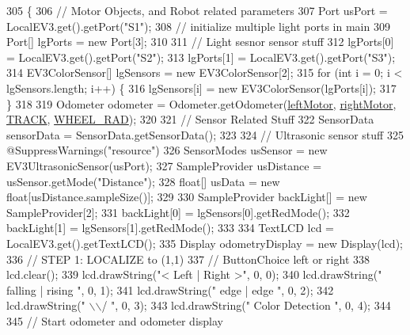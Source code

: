 \begin{DoxyCode}
305                                                       \{
306     \textcolor{comment}{// Motor Objects, and Robot related parameters}
307     Port usPort = LocalEV3.get().getPort(\textcolor{stringliteral}{"S1"});
308     \textcolor{comment}{// initialize multiple light ports in main}
309     Port[] lgPorts = \textcolor{keyword}{new} Port[3];
310 
311     \textcolor{comment}{// Light sesnor sensor stuff}
312     lgPorts[0] = LocalEV3.get().getPort(\textcolor{stringliteral}{"S2"});
313     lgPorts[1] = LocalEV3.get().getPort(\textcolor{stringliteral}{"S3"});
314     EV3ColorSensor[] lgSensors = \textcolor{keyword}{new} EV3ColorSensor[2];
315     \textcolor{keywordflow}{for} (\textcolor{keywordtype}{int} i = 0; i < lgSensors.length; i++) \{
316       lgSensors[i] = \textcolor{keyword}{new} EV3ColorSensor(lgPorts[i]);
317     \}
318 
319     Odometer odometer = Odometer.getOdometer(\hyperlink{enumca_1_1mcgill_1_1ecse211_1_1project_1_1_game_a7c673571bf50fdb6917a9d7bb671e003}{leftMotor}, \hyperlink{enumca_1_1mcgill_1_1ecse211_1_1project_1_1_game_a7a05fcf37c4435c32270776a427ba0d2}{rightMotor}, 
      \hyperlink{enumca_1_1mcgill_1_1ecse211_1_1project_1_1_game_a64cf12cdd6772ac1ce351ff1dfadd626}{TRACK}, \hyperlink{enumca_1_1mcgill_1_1ecse211_1_1project_1_1_game_a91bd64670c2a91d006c907142783b1f8}{WHEEL\_RAD});
320 
321     \textcolor{comment}{// Sensor Related Stuff}
322     SensorData sensorData = SensorData.getSensorData();
323 
324     \textcolor{comment}{// Ultrasonic sensor stuff}
325     @SuppressWarnings(\textcolor{stringliteral}{"resource"})
326     SensorModes usSensor = new EV3UltrasonicSensor(usPort);
327     SampleProvider usDistance = usSensor.getMode("Distance");
328     \textcolor{keywordtype}{float}[] usData = new \textcolor{keywordtype}{float}[usDistance.sampleSize()];
329 
330     SampleProvider backLight[] = new SampleProvider[2];
331     backLight[0] = lgSensors[0].getRedMode();
332     backLight[1] = lgSensors[1].getRedMode();
333 
334     TextLCD lcd = LocalEV3.get().getTextLCD();
335     Display odometryDisplay = new Display(lcd);
336     \textcolor{comment}{// STEP 1: LOCALIZE to (1,1)}
337     \textcolor{comment}{// ButtonChoice left or right}
338     lcd.clear();
339     lcd.drawString("<  Left  |  Right >", 0, 0);
340     lcd.drawString(" falling | rising  ", 0, 1);
341     lcd.drawString("  edge   |  edge   ", 0, 2);
342     lcd.drawString("        \(\backslash\)\(\backslash\)/        ", 0, 3);
343     lcd.drawString("  Color Detection  ", 0, 4);
344 
345     \textcolor{comment}{// Start odometer and odometer display}

\end{DoxyCode}
